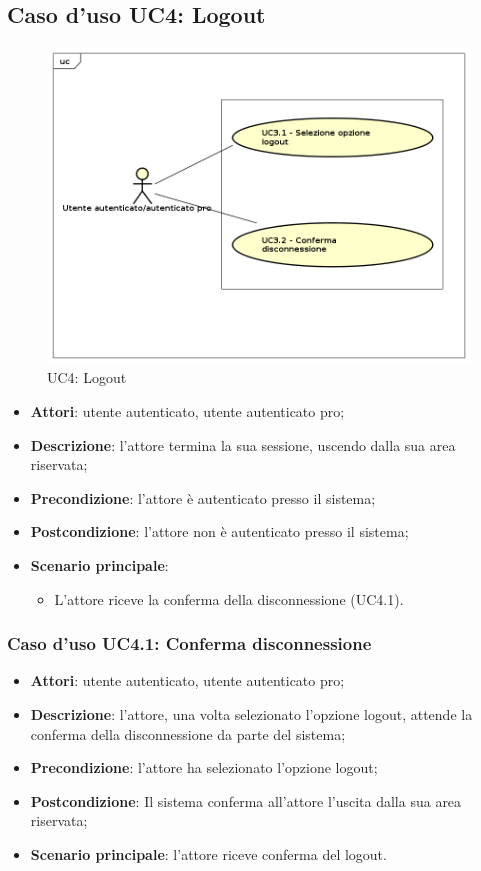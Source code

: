 \subsection{Caso d'uso UC4: Logout}
	\label{UC4}
	\begin{figure}[h]
		\centering
			\includegraphics[scale=0.5,keepaspectratio]{UML/UC4.png}
		\caption{UC4: Logout}
	\end{figure}
	\FloatBarrier
	\begin{itemize}
		\item
			\textbf{Attori}: utente autenticato, utente autenticato pro;
		\item		
			\textbf{Descrizione}: l'attore termina la sua sessione, uscendo dalla sua area riservata;
		\item
			\textbf{Precondizione}: l'attore è autenticato presso il sistema;
		\item
			\textbf{Postcondizione}: l'attore non è autenticato presso il sistema;
		\item
			\textbf{Scenario principale}:
	       		\begin{itemize}
					\item
					L'attore riceve la conferma della disconnessione (UC4.1).
	 			\end{itemize}
	\end{itemize}

\subsubsection{Caso d'uso UC4.1: Conferma disconnessione}
	\begin{itemize}
		\item
			\textbf{Attori}: utente autenticato, utente autenticato pro;
		\item
			\textbf{Descrizione}: l'attore, una volta selezionato l'opzione logout, attende la conferma della disconnessione da parte del sistema;
 		\item
			\textbf{Precondizione}: l'attore ha selezionato l'opzione logout;
		\item
			\textbf{Postcondizione}: Il sistema conferma all'attore l'uscita dalla sua area riservata;
		\item
			\textbf{Scenario principale}: l'attore riceve conferma del logout.
	\end{itemize}		
	